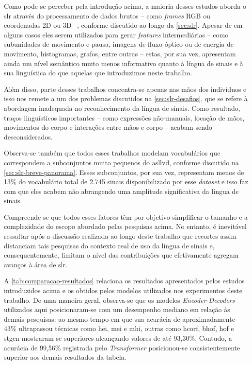 Como pode-se perceber pela introdução acima, a maioria desses estudos aborda o \acrshort{slr} através do processamento de dados brutos -- como \textit{frames} RGB ou coordenadas 2D ou 3D --, conforme discutido ao longo da \autoref{sec:slr}.
Apesar de em alguns casos eles serem utilizados para gerar \textit{features} intermediárias -- como subunidades de movimento e pausa, imagens de fluxo óptico ou de energia de movimento, histogramas, grafos, entre outras -- estas, por sua vez, apresentam ainda um nível semântico muito menos informativo quanto à língua de sinais e à sua linguística do que aquelas que introduzimos neste trabalho.

Além disso, parte desses trabalhos concentra-se apenas nas mãos dos indivíduos e isso nos remete a um dos problemas discutidos na \autoref{sec:slr-desafios}, que se refere à abordagem inadequada no reconhecimento da língua de sinais. Como resultado, traços linguísticos importantes -- como expressões não-manuais, locação de mãos, movimentos do corpo e interações entre mãos e corpo -- acabam sendo desconsiderados.

Observa-se também que todos esses trabalhos modelam vocabulários que correspondem a subconjuntos muito pequenos do \acrshort{asllvd}, conforme discutido na \autoref{sec:slr-breve-panorama}.
Esses subconjuntos, por sua vez, representam menos de 13\% do vocabulário total de 2.745 sinais disponibilizado por esse \textit{dataset} e isso faz com que eles acabem não abrangendo uma amplitude significativa da língua de sinais.

Compreende-se que todos esses fatores têm por objetivo simplificar o tamanho e a complexidade do escopo abordado pelas pesquisas acima. No entanto, é inevitável ressaltar após a discussão realizada ao longo deste trabalho que recortes assim distanciam tais pesquisas do contexto real de uso da língua de sinais e, consequentemente, limitam o nível das contribuições que efetivamente agregam avanços à área de \acrshort{slr}.


A \autoref{tab:comparacao-resultados} relaciona os resultados apresentados pelos estudos introduzidos acima e os obtidos pelos modelos utilizados nos experimentos deste trabalho.
De uma maneira geral, observa-se que os modelos \textit{Encoder-Decoders} utilizados aqui posicionaram-se com um desempenho mediano em relação às demais pesquisas: ao mesmo tempo em que sua acurácia de aproximadamente 43\% ultrapassou técnicas como \acrshort{hei}, \acrshort{mei} e \acrshort{mhi}, outras como \acrshort{hcorf}, \acrshort{bhof}, \acrshort{hof} e \acrshort{stgcn} mostraram-se superiores alcançando valores de até 93,30\%.
Contudo, a acurácia de 99,56\% registrada pelo \textit{Transformer} posicionou-se consistentemente superior aos demais resultados da tabela.

